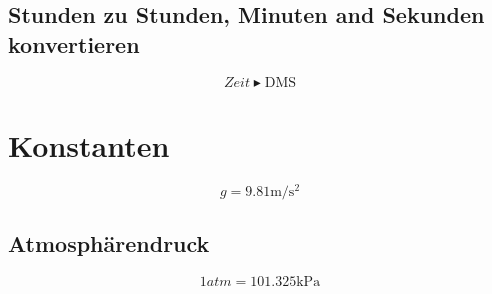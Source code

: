 \documentclass[a4paper]{IEEEtran}
\begin{document}
  \subsection{Stunden zu Stunden, Minuten and Sekunden konvertieren}
  \begin{equation}
    Zeit \blacktriangleright \mbox{DMS}
  \end{equation}

  \section{Konstanten}
  \begin{equation}
    g = 9.81 \si{\metre\per\square\second}
  \end{equation}
  \subsection{Atmosphärendruck}
  \begin{equation}
    1 atm = 101.325 \si{\kilo\pascal}
  \end{equation}
\end{document}
